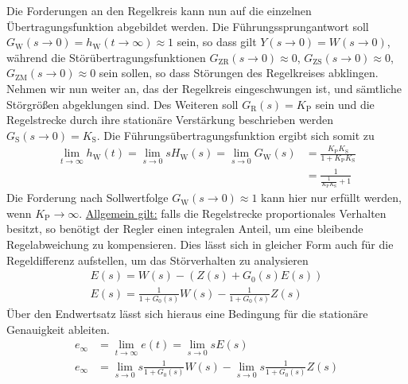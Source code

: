 %
%
Die Forderungen an den Regelkreis kann nun auf die einzelnen Übertragungsfunktion abgebildet werden. Die Führungssprungantwort soll $G_{\text{W}}(s\rightarrow 0)=h_{\text{W}}(t \rightarrow\infty)\approx 1$ sein, so dass gilt $Y(s\rightarrow 0)=W(s\rightarrow 0)$, während die Störübertragungsfunktionen $G_{\text{ZR}}(s\rightarrow 0)\approx 0$, $G_{\text{ZS}}(s\rightarrow 0)\approx 0$, $G_{\text{ZM}}(s\rightarrow 0)\approx 0$ sein sollen, so dass Störungen des Regelkreises abklingen.
Nehmen wir nun weiter an, das der Regelkreis eingeschwungen ist, und sämtliche Störgrößen abgeklungen sind. Des Weiteren soll $G_{\text{R}}(s)=K_{\text{P}}$ sein und die Regelstrecke durch ihre stationäre Verstärkung beschrieben werden $G_{\text{S}}(s\rightarrow 0)=K_{\text{S}}$. Die Führungsübertragungsfunktion ergibt sich somit zu
%
\begin{equation*}
\begin{aligned}
	\lim\limits_{t\rightarrow\infty}h_{\text{W}}(t)=\lim\limits_{s\rightarrow 0}sH_{\text{W}}(s)=\lim\limits_{s\rightarrow 0}G_{\text{W}}(s)&=\frac{K_{\text{P}}K_{\text{S}}}{1+K_{\text{P}}K_{\text{S}}}\\
	&=\frac{1}{\frac{1}{K_{\text{P}}K_{\text{S}}}+1}
\end{aligned}
\end{equation*}    
%
Die Forderung nach Sollwertfolge $G_{\text{W}}(s\rightarrow 0)\approx 1$ kann hier nur erfüllt werden, wenn $K_{\text{P}}\rightarrow \infty$. \underline{Allgemein gilt:} falls die Regelstrecke proportionales Verhalten besitzt, so benötigt der Regler einen integralen Anteil, um eine bleibende Regelabweichung zu kompensieren. Dies lässt sich in gleicher Form auch für die Regeldifferenz aufstellen, um das Störverhalten zu analysieren 
%
\begin{equation*}
\begin{aligned}
%
E(s)=W(s)-\left(Z(s)+G_{0}(s)E(s)\right)\\
%
E(s)=\frac{1}{1+G_{0}(s)}W(s)-\frac{1}{1+G_{0}(s)}Z(s)
%
\end{aligned}
\end{equation*}  
%
Über den Endwertsatz lässt sich hieraus eine Bedingung für die stationäre Genauigkeit ableiten.
%
\begin{equation*}
\begin{aligned}
%
e_{\infty}&=\lim\limits_{t\rightarrow\infty}e(t)=\lim\limits_{s\rightarrow 0}s E(s)\\
%
e_{\infty}&=\lim\limits_{s\rightarrow 0}s\frac{1}{1+G_{0}(s)}W(s)-\lim\limits_{s\rightarrow 0}s\frac{1}{1+G_{0}(s)}Z(s)
%
\end{aligned}
\end{equation*}  
